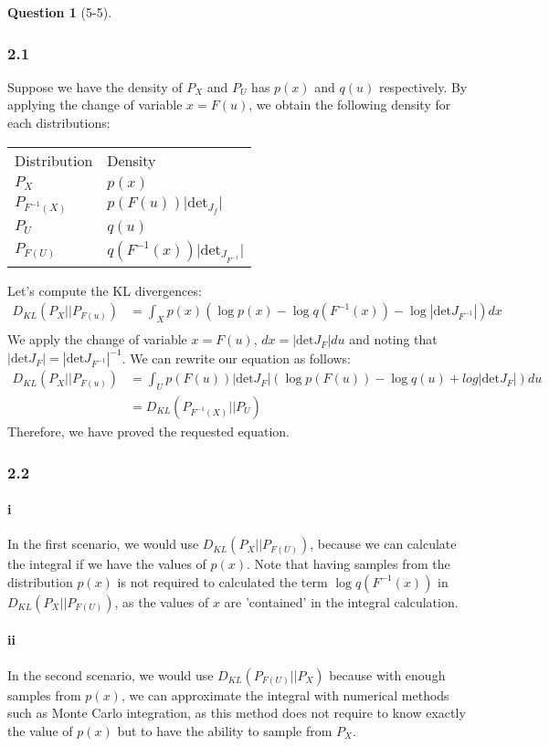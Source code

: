 \documentclass[12pt]{article}
\theoremstyle{definition}
\newtheorem{exercise}{Question}%
\begin{document}
\begin{exercise}[5-5]
{  \subsubsection*{2.1}
Suppose we have the density of $P_{X }$ and $P_{U}$ has $p(x)$ and $q(u)$ respectively.
By applying the change of variable $x = F(u)$, we obtain the following density for each distributions:
\begin{table}[H]
\centering
\begin{tabular}{ll}
Distribution & Density  \\
 $P_X $ & $p(x)$ \\
 $P_{F^{-1}(X)}$&  $p(F(u))\vert \text{det}_{J_{f}} \vert $ \\
 $P_U $& $q(u)$ \\
 $P_{F(U)} $& $q(F^{-1}(x)) \vert \text{det}_{J_{F^{-1}}}  \vert$
\end{tabular}%
\end{table}
Let's compute the KL divergences:
\begin{align*}
  D_{KL} (P_{X}|| P_{F(u)}) &= \int_{X} p(x) (\log p(x) - \log q(F^{-1}(x)) - \log |\text{det} J_{F^{-1}}|) dx \\
\end{align*} We apply the change of variable $x = F(u)$,
$dx = | \text{det} J_{F}| du$ and noting that
$|\text{det} J_{F}|= | \text{det} J_{F^{-1}} |^{-1}$. We can rewrite our
equation as follows:
\begin{align*}
D_{KL} (P_{X}|| P_{F(u)}) &= \int_{U} p(F(u))|\text{det}  J_{F}| (\log p(F(u)) - \log q(u) + log | \text{det} J_F |) du\\
  &= D_{KL}(P_{F^{-1}(X) }|| P_{U})
\end{align*}Therefore, we have proved the requested equation.
  \subsubsection*{2.2}
  \paragraph{i}
  In the first scenario, we would use $D_{KL}(P_{X}||P_{F(U)})$, because we can
  calculate the integral if we have the values of $p(x)$. Note that having
  samples from the distribution $p(x)$ is not required to calculated
  the term $\log q(F^{-1}(x))$ in $D_{KL}(P_{X}||P_{F(U)})$, as the values of
  $x$ are 'contained' in the integral calculation.
  \paragraph{ii} In the second scenario, we would use $D_{KL}(P_{F(U)}||P_{X})$
  because with enough samples from $p(x)$, we can approximate the integral with
  numerical methods such as Monte Carlo integration, as this method does not
  require to know exactly the value of $p(x)$ but to have the ability to sample
  from $P_{X}$.
}
\end{exercise}
\end{document}
